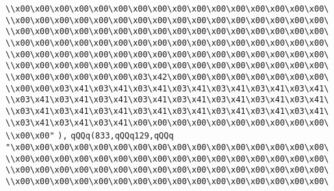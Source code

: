 \verb|\\x00\x00\x00\x00\x00\x00\x00\x00\x00\x00\x00\x00\x00\x00\x00\x00\|\newline
\verb|\\x00\x00\x00\x00\x00\x00\x00\x00\x00\x00\x00\x00\x00\x00\x00\x00\|\newline
\verb|\\x00\x00\x00\x00\x00\x00\x00\x00\x00\x00\x00\x00\x00\x00\x00\x00\|\newline
\verb|\\x00\x00\x00\x00\x00\x00\x00\x00\x00\x00\x00\x00\x00\x00\x00\x00\|\newline
\verb|\\x00\x00\x00\x00\x00\x00\x00\x00\x00\x00\x00\x00\x00\x00\x00\x00\|\newline
\verb|\\x00\x00\x00\x00\x00\x00\x00\x00\x00\x00\x00\x00\x00\x00\x00\x00\|\newline
\verb|\\x00\x00\x00\x00\x00\x00\x03\x42\x00\x00\x00\x00\x00\x00\x00\x00\|\newline
\verb|\\x00\x00\x03\x41\x03\x41\x03\x41\x03\x41\x03\x41\x03\x41\x03\x41\|\newline
\verb|\\x03\x41\x03\x41\x03\x41\x03\x41\x03\x41\x03\x41\x03\x41\x03\x41\|\newline
\verb|\\x03\x41\x03\x41\x03\x41\x03\x41\x03\x41\x03\x41\x03\x41\x03\x41\|\newline
\verb|\\x03\x41\x03\x41\x03\x41\x00\x00\x00\x00\x00\x00\x00\x00\x00\x00\|\newline
\verb|\\x00\x00"|\newline
\verb|),|\newline
\verb|qQQq(833,qQQq129,qQQq|\newline
\verb|"\x00\x00\x00\x00\x00\x00\x00\x00\x00\x00\x00\x00\x00\x00\x00\x00\|\newline
\verb|\\x00\x00\x00\x00\x00\x00\x00\x00\x00\x00\x00\x00\x00\x00\x00\x00\|\newline
\verb|\\x00\x00\x00\x00\x00\x00\x00\x00\x00\x00\x00\x00\x00\x00\x00\x00\|\newline
\verb|\\x00\x00\x00\x00\x00\x00\x00\x00\x00\x00\x00\x00\x00\x00\x00\x00\|\newline
